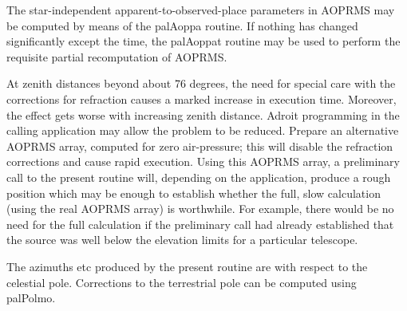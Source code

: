\documentclass[twoside,11pt,nolof]{starlink}
\begin{document}
{{{         \sstitem
          The star-independent apparent-to-observed-place parameters
           in AOPRMS may be computed by means of the palAoppa routine.
           If nothing has changed significantly except the time, the
           palAoppat routine may be used to perform the requisite
           partial recomputation of AOPRMS.

         \sstitem
          At zenith distances beyond about 76 degrees, the need for
           special care with the corrections for refraction causes a
           marked increase in execution time.  Moreover, the effect
           gets worse with increasing zenith distance.  Adroit
           programming in the calling application may allow the
           problem to be reduced.  Prepare an alternative AOPRMS array,
           computed for zero air-pressure;  this will disable the
           refraction corrections and cause rapid execution.  Using
           this AOPRMS array, a preliminary call to the present routine
           will, depending on the application, produce a rough position
           which may be enough to establish whether the full, slow
           calculation (using the real AOPRMS array) is worthwhile.
           For example, there would be no need for the full calculation
           if the preliminary call had already established that the
           source was well below the elevation limits for a particular
           telescope.

         \sstitem
          The azimuths etc produced by the present routine are with
           respect to the celestial pole.  Corrections to the terrestrial
           pole can be computed using palPolmo.
      }
   }
}
\end{document}
